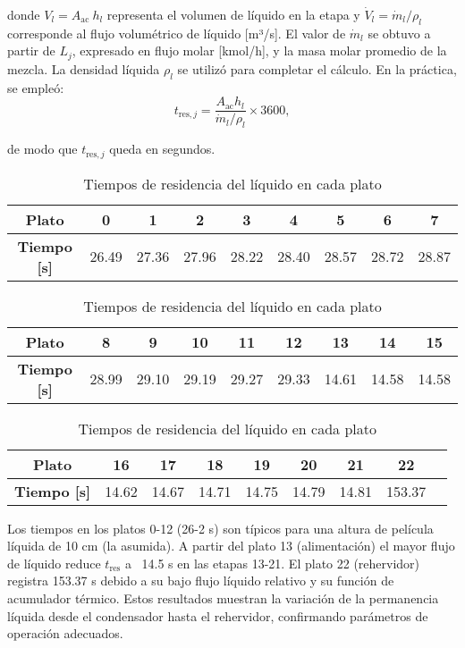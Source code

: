 donde $V_l = A_{\mathrm{ac}}\ h_{l}$ representa el volumen de líquido en la etapa y $\dot{V}_{l} = \dot{m}_{l} / \rho_{l}$ corresponde al flujo volumétrico de líquido [m³/s]. El valor de $\dot{m}_{l}$ se obtuvo a partir de $L_j$, expresado en flujo molar [kmol/h], y la masa molar promedio de la mezcla. La densidad líquida $\rho_{l}$ se utilizó para completar el cálculo. En la práctica, se empleó:
$$
    t_{\text{res},j} = \frac{A_{\text{ac}}h_{l}}{\dot{m}_{l}/\rho_{l}} \times 3600,
$$

de modo que $t_{\text{res},j}$ queda en segundos.

\begin{table}[ht]
    \centering\small
    \begin{tabular}{|c|*{8}{c|}}
        \hline
        \textbf{Plato}      & 0     & 1     & 2     & 3     & 4     & 5     & 6     & 7     \\ \hline
        \textbf{Tiempo [s]} & 26.49 & 27.36 & 27.96 & 28.22 & 28.40 & 28.57 & 28.72 & 28.87 \\ \hline
    \end{tabular}

    \vspace{1em}
    \begin{tabular}{|c|*{8}{c|}}
        \hline
        \textbf{Plato}      & 8     & 9     & 10    & 11    & 12    & 13    & 14    & 15    \\ \hline
        \textbf{Tiempo [s]} & 28.99 & 29.10 & 29.19 & 29.27 & 29.33 & 14.61 & 14.58 & 14.58 \\ \hline
    \end{tabular}

    \vspace{1em}
    \begin{tabular}{|c|*{8}{c|}}
        \hline
        \textbf{Plato}      & 16    & 17    & 18    & 19    & 20    & 21    & 22     \\ \hline
        \textbf{Tiempo [s]} & 14.62 & 14.67 & 14.71 & 14.75 & 14.79 & 14.81 & 153.37 \\ \hline
    \end{tabular}

    \vspace{1em}
    \caption{Tiempos de residencia del líquido en cada plato}
\end{table}
\vspace{-1.5em}
Los tiempos en los platos 0-12 (26-2 s) son típicos para una altura de película líquida de 10 cm (la asumida). A partir del plato 13 (alimentación) el mayor flujo de líquido reduce $t_{\text{res}}$ a ~14.5 s en las etapas 13-21. El plato 22 (rehervidor) registra 153.37 s debido a su bajo flujo líquido relativo y su función de acumulador térmico. Estos resultados muestran la variación de la permanencia líquida desde el condensador hasta el rehervidor, confirmando parámetros de operación adecuados.
